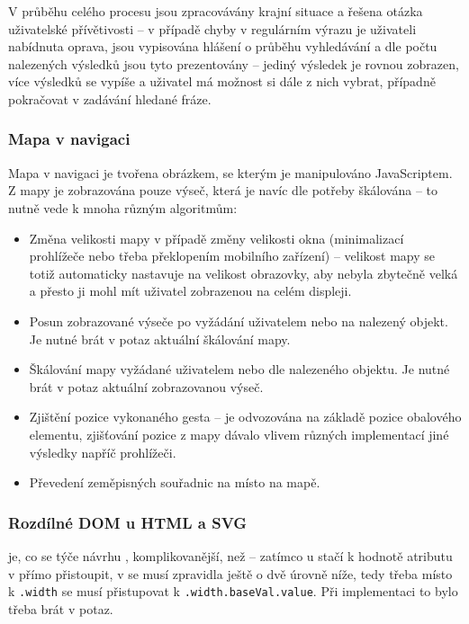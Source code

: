 V průběhu celého procesu jsou zpracovávány krajní situace a řešena otázka uživatelské přívětivosti -- v případě chyby v regulárním výrazu je uživateli nabídnuta oprava, jsou vypisována hlášení o průběhu vyhledávání a dle počtu nalezených výsledků jsou tyto prezentovány -- jediný výsledek je rovnou zobrazen, více výsledků se vypíše a uživatel má možnost si dále z nich vybrat, případně pokračovat v zadávání hledané fráze.

\subsubsection{Mapa v navigaci}
Mapa v navigaci je tvořena  obrázkem, se kterým je manipulováno JavaScriptem. Z mapy je zobrazována pouze výseč, která je navíc dle potřeby škálována -- to nutně vede k mnoha různým algoritmům:
\begin{itemize}
 \item Změna velikosti mapy v případě změny velikosti okna (minimalizací prohlížeče nebo třeba překlopením mobilního zařízení) -- velikost mapy se totiž automaticky nastavuje na velikost obrazovky, aby nebyla zbytečně velká a přesto ji mohl mít uživatel zobrazenou na celém displeji.
 \item Posun zobrazované výseče po vyžádání uživatelem nebo na nalezený objekt. Je nutné brát v potaz aktuální škálování mapy.
 \item Škálování mapy vyžádané uživatelem nebo dle nalezeného objektu. Je nutné brát v potaz aktuální zobrazovanou výseč.
 \item Zjištění pozice vykonaného gesta -- je odvozována na základě pozice obalového elementu, zjišťování pozice z mapy dávalo vlivem různých implementací jiné výsledky napříč prohlížeči.
 \item Převedení zeměpisných souřadnic na místo na mapě.
\end{itemize}


\subsubsection{Rozdílné DOM u HTML a SVG}
 je, co se týče návrhu , komplikovanější, než  -- zatímco u  stačí k hodnotě atributu v  přímo přistoupit, v  se musí zpravidla ještě o dvě úrovně níže, tedy třeba místo k \texttt{.width} se musí přistupovat k \texttt{.width.baseVal.value}. Při implementaci to bylo třeba brát v potaz.

